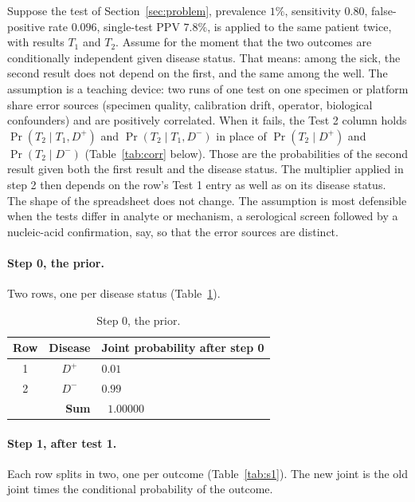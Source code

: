 \documentclass[11pt]{article}
\begin{document}
Suppose the test of Section~\ref{sec:problem}, prevalence $1\%$, sensitivity $0.80$, false-positive rate $0.096$, single-test PPV $7.8\%$, is applied to the same patient twice, with results $T_1$ and $T_2$. Assume for the moment that the two outcomes are conditionally independent given disease status. That means: among the sick, the second result does not depend on the first, and the same among the well. The assumption is a teaching device: two runs of one test on one specimen or platform share error sources (specimen quality, calibration drift, operator, biological confounders) and are positively correlated. When it fails, the Test 2 column holds $\Pr(T_2 \mid T_1, D^+)$ and $\Pr(T_2 \mid T_1, D^-)$ in place of $\Pr(T_2 \mid D^+)$ and $\Pr(T_2 \mid D^-)$ (Table~\ref{tab:corr} below). Those are the probabilities of the second result given both the first result and the disease status. The multiplier applied in step 2 then depends on the row's Test 1 entry as well as on its disease status. The shape of the spreadsheet does not change. The assumption is most defensible when the tests differ in analyte or mechanism, a serological screen followed by a nucleic-acid confirmation, say, so that the error sources are distinct.

\paragraph{Step 0, the prior.} Two rows, one per disease status (Table~\ref{tab:s0}).

\begin{table}[H]
\centering
\renewcommand{\arraystretch}{1.15}
\begin{tabular}{c|c|l}
\toprule
\textbf{Row} & \textbf{Disease} & \textbf{Joint probability after step 0} \\
\midrule
1 & $D^+$      & $0.01$ \\
2 & $D^-$ & $0.99$ \\
\midrule
  & \multicolumn{1}{r|}{\textbf{Sum}} & $\;\;\mathbf{1.00000}$ \\
\bottomrule
\end{tabular}
\caption{Step 0, the prior.}
\label{tab:s0}
\end{table}

\paragraph{Step 1, after test 1.} Each row splits in two, one per outcome (Table~\ref{tab:s1}). The new joint is the old joint times the conditional probability of the outcome.
\end{document}
